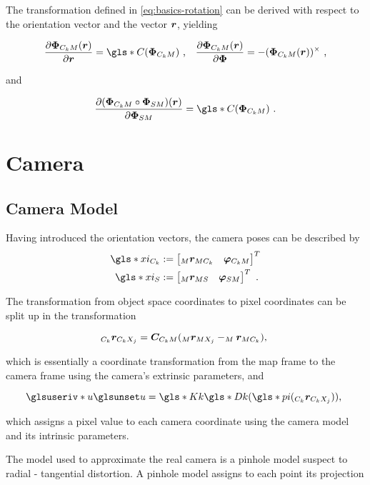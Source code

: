 The transformation defined in \ref{eq:basics-rotation} can be derived with
respect to the orientation vector \Phic and the vector $\bm{r}$, yielding

\begin{align}
  \pderiv{\Phic(\vc {r})}{\vc r} = \g{C}(\Phic) \text{ ,} \quad 
  \pderiv{\Phic(\vc {r})}{\vc \Phi} = -(\Phic(\vc r))^\times
  \text{ ,}
\end{align}

and

\begin{equation}
  \pderiv{(\Phic \circ \Phis)(\vc {r})}{\Phis} = \g{C}(\Phic) \text{ .}
\end{equation}

\section{Camera}
\subsection{Camera Model}

Having introduced the orientation vectors, the camera poses can be described by
\begin{align*}
  \g{xi}_{C_k} &:= \rowvector{\mrmc & \phic}^T \\
  \g{xi}_S &:= \rowvector{\mrms & \phis}^T \text{ .}
\end{align*}

The transformation from object space coordinates \mrmx to pixel coordinates
 can be split up in the transformation 
      
\begin{equation*}
  _{C_{k}}\bm{r}_{C_kX_j} = \bm{C}_{C_kM} (_{M}\bm{r}_{MX_j} - _{M}\bm{r}_{MC_k}) \text{, }
\end{equation*}

which is essentially a coordinate transformation from the map frame to the camera
frame using the camera's extrinsic parameters, and 

\begin{equation}
  \giv{u} = \g{Kk} \g{Dk}(\g{pi}(\crcx)) \text{, }
  \label{eq:unrectified}
\end{equation}

which assigns a pixel value to each camera coordinate using the camera model and
its intrinsic parameters.

The model used to approximate the real camera is a pinhole model suspect to
radial - tangential distortion. A pinhole model assigns to each point \crcx
its projection

